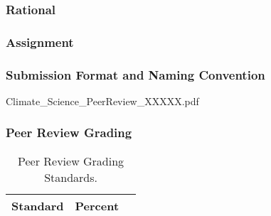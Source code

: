 
\subsubsection{Rational}

\subsubsection{Assignment}

\subsubsection{Submission Format and Naming Convention}

Climate\_Science\_PeerReview\_XXXXX.pdf

\subsubsection{Peer Review Grading}


\begin{table}[h]
\caption{Peer Review Grading Standards.}
\label{tab:peerreviewgrading}
\begin{tabular}{lll}\hline
Standard      &   Percent   & \\ \hline\hline
\hline
\end{tabular}
\end{table}

